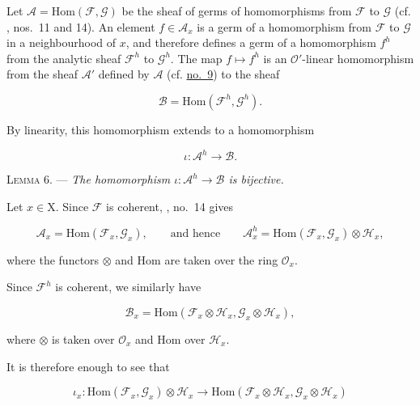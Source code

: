 
Let $\mathcal{A}=\mathrm{Hom}(\mathcal{F},\mathcal{G})$ be the sheaf of germs of homomorphisms from $\mathcal{F}$ to $\mathcal{G}$ (cf. , nos.~11 and 14). An element $f\in\mathcal{A}_x$ is a germ of a homomorphism from $\mathcal{F}$ to $\mathcal{G}$ in a neighbourhood of $x$, and therefore defines a germ of a homomorphism $f^h$ from the analytic sheaf $\mathcal{F}^h$ to $\mathcal{G}^h$. The map $f\mapsto f^h$ is an $\mathcal{O}'$-linear homomorphism from the sheaf $\mathcal{A}'$ defined by $\mathcal{A}$ (cf. \hyperref[gaga:no:9]{no.~9}) to the sheaf

\begin{equation*}
\mathcal{B}=\mathrm{Hom}(\mathcal{F}^h,\mathcal{G}^h).
\end{equation*}

By linearity, this homomorphism extends to a homomorphism

\begin{equation*}
\iota:\mathcal{A}^h\longrightarrow\mathcal{B}.
\end{equation*}

\textsc{Lemma 6}. --- \emph{The homomorphism $\iota:\mathcal{A}^h\to\mathcal{B}$ is bijective.}

Let $x\in \mathrm{X}$. Since $\mathcal{F}$ is coherent, , no.~14 gives

\begin{equation*}
\mathcal{A}_x=\mathrm{Hom}(\mathcal{F}_x,\mathcal{G}_x),
\qquad\text{and hence}\qquad
\mathcal{A}^h_x=
\mathrm{Hom}(\mathcal{F}_x,\mathcal{G}_x)\otimes\mathcal{H}_x,
\end{equation*}

where the functors $\otimes$ and $\mathrm{Hom}$ are taken over the ring $\mathcal{O}_x$.

Since $\mathcal{F}^h$ is coherent, we similarly have

\begin{equation*}
\mathcal{B}_x=
\mathrm{Hom}(\mathcal{F}_x\otimes\mathcal{H}_x,
\mathcal{G}_x\otimes\mathcal{H}_x),
\end{equation*}

where $\otimes$ is taken over $\mathcal{O}_x$ and $\mathrm{Hom}$ over $\mathcal{H}_x$.

It is therefore enough to see that

\begin{equation*}
\iota_x:
\mathrm{Hom}(\mathcal{F}_x,\mathcal{G}_x)\otimes\mathcal{H}_x
\longrightarrow
\mathrm{Hom}(\mathcal{F}_x\otimes\mathcal{H}_x,
\mathcal{G}_x\otimes\mathcal{H}_x)
\end{equation*}

